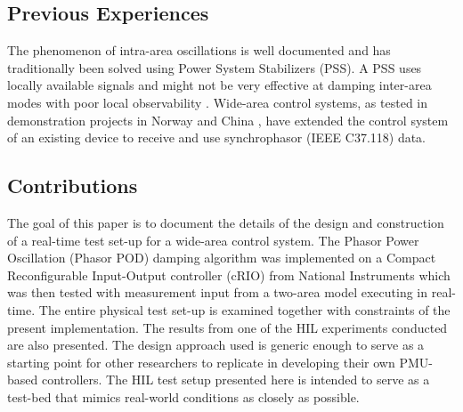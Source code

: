 \documentclass[a4paper, 10 pt, conference]{IEEEtran}
\begin{document}
\subsection{Previous Experiences}
The phenomenon of intra-area oscillations is well documented and has traditionally been solved using Power System Stabilizers (PSS). A PSS uses locally available signals and might not be very effective at damping inter-area modes with poor local observability \cite{Yuwa}\cite{localREMcomparison}. Wide-area control systems, as tested in demonstration projects in Norway \cite{WAPODNorway} and China \cite{WAPODChina}, have extended the control system of an existing device to receive and use synchrophasor (IEEE C37.118) data.
\subsection{Contributions}
The goal of this paper is to document the details of the design and construction of a real-time test set-up for a wide-area control system. The Phasor Power Oscillation (Phasor POD) damping algorithm \cite{PhasorPOD} was implemented on a Compact Reconfigurable Input-Output controller (cRIO) \cite{cRIO9081} from National Instruments which was then tested with measurement input from a two-area model\cite{KundurTwoArea} executing in real-time. The entire physical test set-up is examined together with constraints of the present implementation. The results from one of the HIL experiments conducted are also presented. The design approach used is generic enough to serve as a starting point for other researchers to replicate in developing their own PMU-based controllers. The HIL test setup presented here is intended to serve as a test-bed that mimics real-world conditions as closely as possible.
\end{document}
